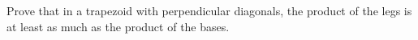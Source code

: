 Prove that in a trapezoid with perpendicular diagonals, the product of the legs is at least as much as the product of the bases.